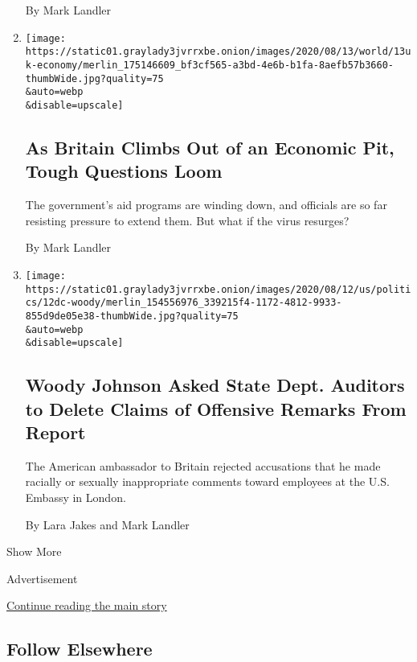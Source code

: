 \begin{enumerate}
  By Mark Landler
\item
  \href{/2020/08/13/world/europe/britain-economy-coronavirus.html}{}

  \texttt{[image: https://static01.graylady3jvrrxbe.onion/images/2020/08/13/world/13uk-economy/merlin\_175146609\_bf3cf565-a3bd-4e6b-b1fa-8aefb57b3660-thumbWide.jpg?quality=75\\\&auto=webp\\\&disable=upscale]}

  \hypertarget{as-britain-climbs-out-of-an-economic-pit-tough-questions-loom}{%
  \subsection{As Britain Climbs Out of an Economic Pit, Tough Questions
  Loom}\label{as-britain-climbs-out-of-an-economic-pit-tough-questions-loom}}

  The government's aid programs are winding down, and officials are so
  far resisting pressure to extend them. But what if the virus resurges?

  By Mark Landler
\item
  \href{/2020/08/12/us/politics/trump-woody-johnson-london-embassy.html}{}

  \texttt{[image: https://static01.graylady3jvrrxbe.onion/images/2020/08/12/us/politics/12dc-woody/merlin\_154556976\_339215f4-1172-4812-9933-855d9de05e38-thumbWide.jpg?quality=75\\\&auto=webp\\\&disable=upscale]}

  \hypertarget{woody-johnson-asked-state-dept-auditors-to-delete-claims-of-offensive-remarks-from-report}{%
  \subsection{Woody Johnson Asked State Dept. Auditors to Delete Claims
  of Offensive Remarks From
  Report}\label{woody-johnson-asked-state-dept-auditors-to-delete-claims-of-offensive-remarks-from-report}}

  The American ambassador to Britain rejected accusations that he made
  racially or sexually inappropriate comments toward employees at the
  U.S. Embassy in London.

  By Lara Jakes and Mark Landler
\end{enumerate}

Show More

Advertisement

\protect\hyperlink{after-mid2}{Continue reading the main story}

\hypertarget{follow-elsewhere}{%
\subsection{Follow Elsewhere}\label{follow-elsewhere}}

